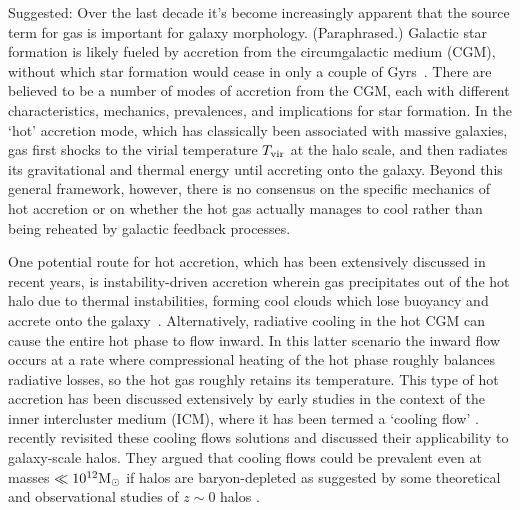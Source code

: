 \documentclass[fleqn,usenatbib]{mnras}
\newcommand{\Tvir}{T_{\rm vir}}
\newcommand{\msun}{{\rm M}_\odot}
\begin{document}
Suggested: Over the last decade it's become increasingly apparent that the source term for gas is important for galaxy morphology. (Paraphrased.)
Galactic star formation is likely fueled by accretion from the circumgalactic medium (CGM), without which star formation would cease in only a couple of Gyrs~\cite[e.g.][]{Prochaska2009, Bauermeister2010, Spring2017}.
There are believed to be a number of modes of accretion from the CGM, each with different characteristics, mechanics, prevalences, and implications for star formation.
In the `hot' accretion mode, which has classically been associated with massive galaxies, gas first shocks to the virial temperature $\Tvir$ at the halo scale, and then radiates its gravitational and thermal energy until accreting onto the galaxy. Beyond this general framework, however, there is no consensus on the specific mechanics of hot accretion or on whether the hot gas actually manages to cool rather than being reheated by galactic feedback processes. 

One potential route for hot accretion, which has been extensively discussed in recent years, is instability-driven accretion wherein gas precipitates out of the hot halo due to thermal instabilities, forming cool clouds which lose buoyancy and accrete onto the galaxy~\citep[e.g.][]{Maller2004, Mccourt2012, Voit2015, Armillotta2016, Gronke2019a, Voit2021}.
Alternatively, radiative cooling in the hot CGM can cause the entire hot phase to flow inward.
In this latter scenario the inward flow occurs at a rate where compressional heating of the hot phase roughly balances radiative losses, so the hot gas roughly retains its temperature.
This type of hot accretion has been discussed extensively by early studies in the context of the inner intercluster medium (ICM), where it has been termed a `cooling flow' \citep[][see \citealt{McNamara2007} for a review]{Mathews78, Cowie80, Fabian84, balbus88, Bertschinger1989}. \cite{Stern2019, Stern2020a} recently revisited these cooling flows solutions and discussed  their applicability to galaxy-scale halos.
They argued that cooling flows could be prevalent even at masses $\ll10^{12}\msun$ if halos are baryon-depleted as suggested by some theoretical and observational studies of $z\sim0$ halos \citep[e.g.,][]{Bregman2018, Hafen2019}. 
\end{document}

